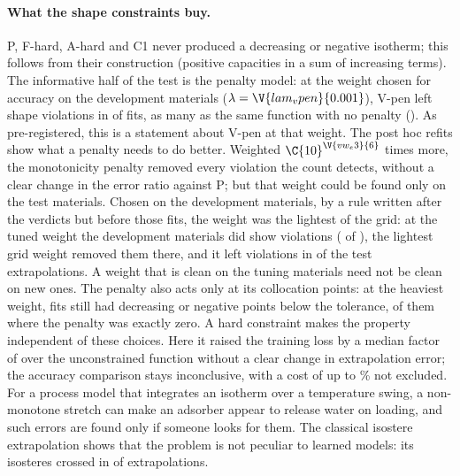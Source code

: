\documentclass[journal=jcisd8,manuscript=article]{achemso}
\begin{document}
\paragraph{What the shape constraints buy.} P, F-hard, A-hard and C1 never produced a decreasing or negative
isotherm; this follows from their construction (positive capacities in a sum of increasing terms). The informative
half of the test is the penalty model: at the weight chosen for accuracy on the development materials
($\lambda = \V{lam_vpen}{0.001}$), V-pen left shape violations in  of  fits, as many as
the same function with no penalty (). As pre-registered, this is a statement about V-pen at that
weight. The post hoc refits show what a penalty needs to do better. Weighted $\C{10}^{\V{vw_e3}{6}}$ times more, the
monotonicity penalty removed every violation the count detects, without a clear change in the error ratio against P;
but that weight could be found only on the test materials. Chosen on the development materials, by a rule written
after the verdicts but before those fits, the weight was the lightest of the grid: at the tuned weight the
development materials did show violations ( of ), the lightest grid weight removed
them there, and it left violations in  of the  test extrapolations. A weight that is
clean on the tuning materials need not be clean on new ones. The penalty also acts only at its collocation
points: at the heaviest weight,  fits still had decreasing or negative points below the tolerance,
 of them where the penalty was exactly zero. A hard constraint makes the property independent of
these choices. Here it raised the training loss by a median factor of  over the
unconstrained function without a clear change in extrapolation error; the accuracy comparison stays inconclusive,
with a cost of up to \% not excluded. For a process model that integrates an isotherm over a
temperature swing, a non-monotone stretch can make an adsorber appear to release water on loading, and such errors
are found only if someone looks for them. The classical isostere extrapolation shows that the problem is not
peculiar to learned models: its isosteres crossed in  of  extrapolations.
\end{document}
